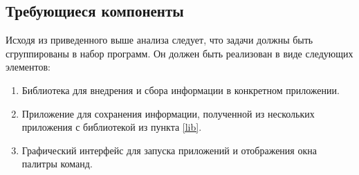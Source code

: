 \subsection{Требующиеся компоненты}

Исходя из приведенного выше анализа следует, что задачи должны быть сгруппированы
в набор программ. Он должен быть реализован в виде следующих элементов:

\begin{enumerate}
	\item\label{lib} Библиотека для внедрения и сбора информации в конкретном
	приложении.
	\item Приложение для сохранения информации, полученной из нескольких
	приложения с библиотекой из пункта \ref{lib}.
	\item Графический интерфейс для запуска приложений и отображения окна
	палитры команд.
\end{enumerate}


